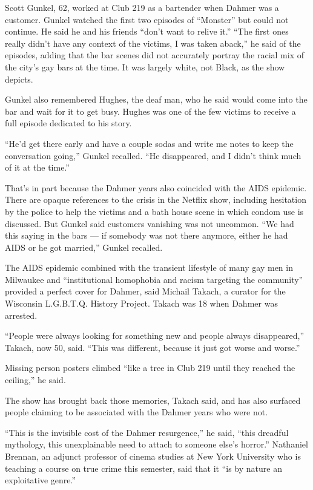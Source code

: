 \documentclass[10pt,a4paper]{article}
\begin{document}
Scott Gunkel, 62, worked at Club 219 as a bartender when Dahmer was a customer. Gunkel watched the first two episodes of “Monster” but could not continue. He said he and his friends “don’t want to relive it.”
“The first ones really didn’t have any context of the victims, I was taken aback,” he said of the episodes, adding that the bar scenes did not accurately portray the racial mix of the city’s gay bars at the time. It was largely white, not Black, as the show depicts.

Gunkel also remembered Hughes, the deaf man, who he said would come into the bar and wait for it to get busy. Hughes was one of the few victims to receive a full episode dedicated to his story.

“He’d get there early and have a couple sodas and write me notes to keep the conversation going,” Gunkel recalled. “He disappeared, and I didn’t think much of it at the time.”

That’s in part because the Dahmer years also coincided with the AIDS epidemic. There are opaque references to the crisis in the Netflix show, including hesitation by the police to help the victims and a bath house scene in which condom use is discussed. But Gunkel said customers vanishing was not uncommon.
“We had this saying in the bars — if somebody was not there anymore, either he had AIDS or he got married,” Gunkel recalled.

The AIDS epidemic combined with the transient lifestyle of many gay men in Milwaukee and “institutional homophobia and racism targeting the community” provided a perfect cover for Dahmer, said Michail Takach, a curator for the Wisconsin L.G.B.T.Q. History Project. Takach was 18 when Dahmer was arrested.

“People were always looking for something new and people always disappeared,” Takach, now 50, said. “This was different, because it just got worse and worse.”

Missing person posters climbed “like a tree in Club 219 until they reached the ceiling,” he said.

The show has brought back those memories, Takach said, and has also surfaced people claiming to be associated with the Dahmer years who were not.

“This is the invisible cost of the Dahmer resurgence,” he said, “this dreadful mythology, this unexplainable need to attach to someone else’s horror.”
Nathaniel Brennan, an adjunct professor of cinema studies at New York University who is teaching a course on true crime this semester, said that it “is by nature an exploitative genre.”
\end{document}
